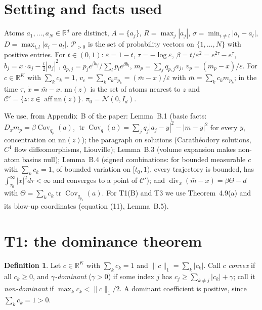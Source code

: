 \documentclass[11pt]{article}
\theoremstyle{definition}
\newtheorem{definition}[theorem]{Definition}
\theoremstyle{remark}
\newcommand{\R}{\mathbb R}
\newcommand{\N}{\mathcal N}
\newcommand{\Ppos}{\mathcal P_{>0}}
\newcommand{\nn}{\mathrm{nn}}
\newcommand{\eps}{\varepsilon}
\DeclareMathOperator{\tr}{tr}
\DeclareMathOperator{\Cov}{Cov}
\DeclareMathOperator{\aff}{aff}
\begin{document}
\section*{Setting and facts used}

Atoms $a_1,\dots,a_N\in\R^d$ are distinct, $A=\{a_j\}$, $R=\max_j|a_j|$, $\sigma=\min_{i\ne l}|a_i-a_l|$,
$D=\max_{i,l}|a_i-a_l|$. $\Ppos$ is the set of probability vectors on $\{1,\dots,N\}$ with positive
entries. For $t\in(0,1)$: $\eps=1-t$, $\tau=-\log\eps$, $\beta=t/\eps^2=e^{2\tau}-e^\tau$,
$b_j=x\cdot a_j-\frac t2|a_j|^2$, $q_{p,j}=p_je^{\beta b_j}/\sum_lp_le^{\beta b_l}$, $m_p=\sum_jq_{p,j}a_j$,
$v_p=(m_p-x)/\eps$. For $c\in\R^K$ with $\sum_kc_k=1$, $v_c=\sum_kc_kv_{p_k}=(\bar m-x)/\eps$ with
$\bar m=\sum_kc_km_{p_k}$; in the time $\tau$, $\dot x=\bar m-x$. $\nn(z)$ is the set of atoms nearest to
$z$ and $\mathcal C'=\{z:z\in\aff\nn(z)\}$. $\pi_0=\N(0,I_d)$.

We use, from Appendix~B of the paper: Lemma~B.1 (basic facts: $D_xm_p=\beta\Cov_{q_p}(a)$,
$\tr\Cov_q(a)=\sum_jq_j|a_j-y|^2-|m-y|^2$ for every $y$, concentration on $\nn(z)$); the paragraph on
solutions (Carath\'eodory solutions, $C^1$ flow diffeomorphisms, Liouville); Lemma~B.3 (volume
expansion makes non-atom basins null); Lemma~B.4 (signed combinations: for bounded measurable $c$
with $\sum_kc_k=1$, of bounded variation on $[t_0,1)$, every trajectory is bounded, has
$\int_{\tau_0}^\infty|\dot x|^2d\tau<\infty$ and converges to a point of $\mathcal C'$); and
$\operatorname{div}_x(\bar m-x)=\beta\Theta-d$ with $\Theta=\sum_kc_k\tr\Cov_{q_{p_k}}(a)$. For T1(B)
and T3 we use Theorem~4.9(a) and its blow-up coordinates (equation (11), Lemma~B.5).

\section{T1: the dominance theorem}
\label{sec:t1}

\begin{definition}
Let $c\in\R^K$ with $\sum_kc_k=1$ and $\|c\|_1=\sum_k|c_k|$. Call $c$ \emph{convex} if all
$c_k\ge0$, and \emph{$\gamma$-dominant} ($\gamma>0$) if some index $j$ has
$c_j\ge\sum_{k\ne j}|c_k|+\gamma$; call it \emph{non-dominant} if $\max_kc_k<\|c\|_1/2$. A dominant
coefficient is positive, since $\sum_kc_k=1>0$.
\end{definition}
\end{document}
